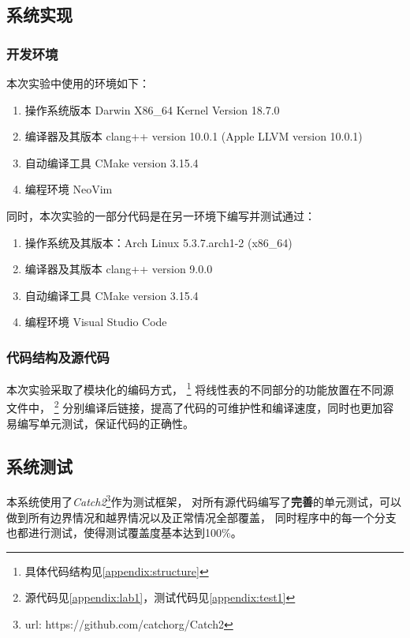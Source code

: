\documentclass[format=draft,language=chinese,category=academic-report]{hustreport}
\begin{document}
\subsection{系统实现}
\subsubsection{开发环境}
本次实验中使用的环境如下：
\begin{enumerate}
    \item 操作系统版本 Darwin X86\_64 Kernel Version 18.7.0
    \item 编译器及其版本 clang++ version 10.0.1 (Apple LLVM version 10.0.1)
    \item 自动编译工具 CMake version 3.15.4
    \item 编程环境 NeoVim
\end{enumerate}
同时，本次实验的一部分代码是在另一环境下编写并测试通过：
\begin{enumerate}
    \item 操作系统及其版本：Arch Linux 5.3.7.arch1-2 (x86\_64)
    \item 编译器及其版本 clang++ version 9.0.0
    \item 自动编译工具 CMake version 3.15.4
    \item 编程环境 Visual Studio Code
\end{enumerate}
\subsubsection{代码结构及源代码}
本次实验采取了模块化的编码方式，
\footnote{具体代码结构见\autoref{appendix:structure}}
将线性表的不同部分的功能放置在不同源文件中，
\footnote{源代码见\autoref{appendix:lab1}，测试代码见\autoref{appendix:test1}}
分别编译后链接，提高了代码的可维护性和编译速度，同时也更加容易编写单元测试，保证代码的正确性。
\subsection{系统测试}
本系统使用了\textit{Catch2}\footnote{url: https://github.com/catchorg/Catch2}作为测试框架，
对所有源代码编写了\textbf{完善}的单元测试，可以做到所有边界情况和越界情况以及正常情况全部覆盖，
同时程序中的每一个分支也都进行测试，使得测试覆盖度基本达到100\%。
\end{document}
